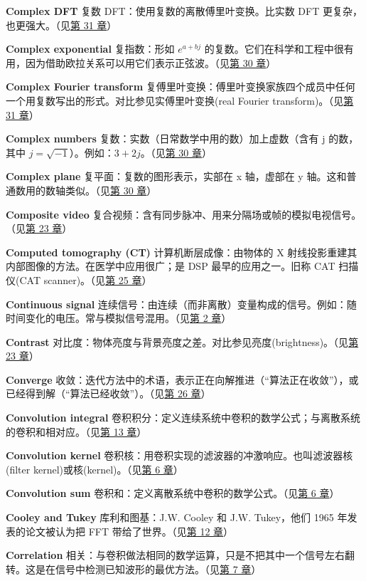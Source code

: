 \textbf{Complex DFT} 复数 DFT：使用复数的离散傅里叶变换。比实数 DFT
更复杂，也更强大。（见\hyperref[ch-31]{第 31 章}）

\textbf{Complex exponential} 复指数：形如 \(e^{a+bj}\)
的复数。它们在科学和工程中很有用，因为借助欧拉关系可以用它们表示正弦波。（见\hyperref[ch-30]{第
30 章}）

\textbf{Complex Fourier transform}
复傅里叶变换：傅里叶变换家族四个成员中任何一个用复数写出的形式。对比参见实傅里叶变换(real
Fourier transform)。（见\hyperref[ch-31]{第 31 章}）

\textbf{Complex numbers} 复数：实数（日常数学中用的数）加上虚数（含有 j
的数，其中 \(j = \sqrt{-1}\)）。例如：\(3+2j\)。（见\hyperref[ch-30]{第
30 章}）

\textbf{Complex plane} 复平面：复数的图形表示，实部在 x 轴，虚部在 y
轴。这和普通数用的数轴类似。（见\hyperref[ch-30]{第 30 章}）

\textbf{Composite video}
复合视频：含有同步脉冲、用来分隔场或帧的模拟电视信号。（见\hyperref[ch-23]{第
23 章}）

\textbf{Computed tomography (CT)} 计算机断层成像：由物体的 X
射线投影重建其内部图像的方法。在医学中应用很广；是 DSP
最早的应用之一。旧称 CAT 扫描仪(CAT scanner)。（见\hyperref[ch-25]{第 25
章}）

\textbf{Continuous signal}
连续信号：由连续（而非离散）变量构成的信号。例如：随时间变化的电压。常与模拟信号混用。（见\hyperref[ch-02]{第
2 章}）

\textbf{Contrast}
对比度：物体亮度与背景亮度之差。对比参见亮度(brightness)。（见\hyperref[ch-23]{第
23 章}）

\textbf{Converge}
收敛：迭代方法中的术语，表示正在向解推进（``算法正在收敛''），或已经得到解（``算法已经收敛''）。（见\hyperref[ch-26]{第
26 章}）

\textbf{Convolution integral}
卷积积分：定义连续系统中卷积的数学公式；与离散系统的卷积和相对应。（见\hyperref[ch-13]{第
13 章}）

\textbf{Convolution kernel}
卷积核：用卷积实现的滤波器的冲激响应。也叫滤波器核(filter
kernel)或核(kernel)。（见\hyperref[ch-06]{第 6 章}）

\textbf{Convolution sum}
卷积和：定义离散系统中卷积的数学公式。（见\hyperref[ch-06]{第 6 章}）

\textbf{Cooley and Tukey} 库利和图基：J.W. Cooley 和 J.W. Tukey，他们
1965 年发表的论文被认为把 FFT 带给了世界。（见\hyperref[ch-12]{第 12
章}）

\textbf{Correlation}
相关：与卷积做法相同的数学运算，只是不把其中一个信号左右翻转。这是在信号中检测已知波形的最优方法。（见\hyperref[ch-07]{第
7 章}）

